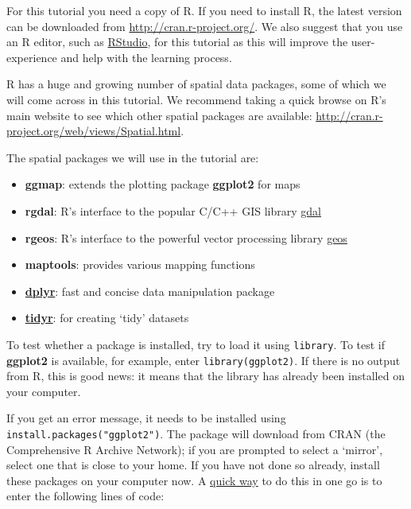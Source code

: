 \documentclass[]{article}
\begin{document}
For this tutorial you need a copy of R. If you need to install R, the
latest version can be downloaded from
\href{http://cran.r-project.org/}{\url{http://cran.r-project.org/}}. We
also suggest that you use an R editor, such as
\href{http://www.rstudio.com/}{RStudio}, for this tutorial as this will
improve the user-experience and help with the learning process.

R has a huge and growing number of spatial data packages, some of which
we will come across in this tutorial. We recommend taking a quick browse
on R's main website to see which other spatial packages are available:
\href{http://cran.r-project.org/web/views/Spatial.html}{\url{http://cran.r-project.org/web/views/Spatial.html}}.

The spatial packages we will use in the tutorial are:

\begin{itemize}
\itemsep1pt\parskip0pt
\item
  \textbf{ggmap}: extends the plotting package \textbf{ggplot2} for maps
\item
  \textbf{rgdal}: R's interface to the popular C/C++ GIS library
  \href{http://www.gdal.org/}{gdal}
\item
  \textbf{rgeos}: R's interface to the powerful vector processing
  library \href{http://trac.osgeo.org/geos/}{geos}
\item
  \textbf{maptools}: provides various mapping functions
\item
  \href{http://cran.r-project.org/web/packages/dplyr/index.html}{\textbf{dplyr}}:
  fast and concise data manipulation package
\item
  \href{http://blog.rstudio.org/2014/07/22/introducing-tidyr/}{\textbf{tidyr}}:
  for creating `tidy' datasets
\end{itemize}

To test whether a package is installed, try to load it using
\texttt{library}. To test if \textbf{ggplot2} is available, for example,
enter \texttt{library(ggplot2)}. If there is no output from R, this is
good news: it means that the library has already been installed on your
computer.

If you get an error message, it needs to be installed using
\texttt{install.packages("ggplot2")}. The package will download from
CRAN (the Comprehensive R Archive Network); if you are prompted to
select a `mirror', select one that is close to your home. If you have
not done so already, install these packages on your computer now. A
\href{http://stackoverflow.com/questions/8175912/load-multiple-packages-at-once}{quick
way} to do this in one go is to enter the following lines of code:
\end{document}
